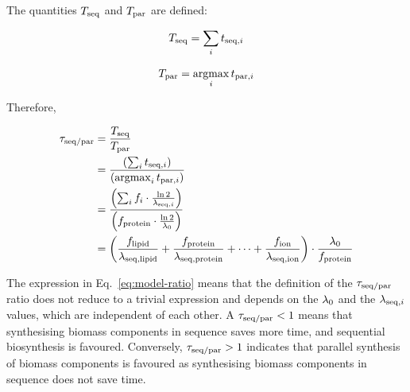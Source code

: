 \pagebreak

The quantities $T_{\mathrm{seq}}$ and $T_{\mathrm{par}}$ are defined:

\begin{equation}
  \Tseq = \sum_{i} \Tiabl %
  \label{eq:model-a}
\end{equation}


\begin{equation}
  T_{\mathrm{par}} = \operatorname*{argmax}_{i} t_{\mathrm{par},i}
  \label{eq:model-b}
\end{equation}


Therefore,

\begin{equation}
  \begin{aligned}
    \tau_{\mathrm{seq}/\mathrm{par}} &= \frac{T_{\mathrm{seq}}}{T_{\mathrm{par}}} \\
    & = \frac{\left( \sum_{i} t_{\mathrm{seq},i} \right)}{\left( \operatorname*{argmax}_{i} t_{\mathrm{par},i} \right)}\\
    & = \frac{\left(  \sum_{i} f_{i} \cdot \frac{\ln 2}{\lambda_{\mathrm{seq},i}} \right)}{\left( f_{\mathrm{protein}} \cdot \frac{\ln 2}{\lambda_{0}} \right)}\\
    & = \left( \frac{f_{\mathrm{lipid}}}{\lambda_{\mathrm{seq},\mathrm{lipid}}} + \frac{f_{\mathrm{protein}}}{\lambda_{\mathrm{seq},\mathrm{protein}}} + \cdots + \frac{f_{\mathrm{ion}}}{\lambda_{\mathrm{seq},\mathrm{ion}}} \right) \cdot \frac{\lambda_{0}}{f_{\mathrm{protein}}}
    \end{aligned}
  \label{eq:model-ratio}
\end{equation}

The expression in Eq.\ \ref{eq:model-ratio} means that the definition of the $\tau_{\mathrm{seq}/\mathrm{par}}$ ratio does not reduce to a trivial expression and depends on the $\lambda_{0}$ and the $\lambda_{\mathrm{seq},i}$ values, which are independent of each other.
A $\tau_{\mathrm{seq}/\mathrm{par}} < 1$ means that synthesising biomass components in sequence saves more time, and sequential biosynthesis is favoured.
Conversely, $\tau_{\mathrm{seq}/\mathrm{par}} > 1$ indicates that parallel synthesis of biomass components is favoured as synthesising biomass components in sequence does not save time.

